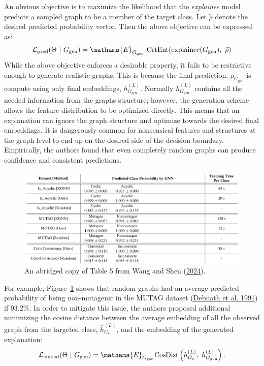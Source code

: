 \documentclass[
  11pt,
  letterpaper,
]{article}
\begin{document}
\quad An obvious objective is to maximize the likelihood that the
\emph{explainee} model predicts a sampled graph to be a member of the
target class. Let \(\tilde{\rho}\) denote the desired predicted
probability vector. Then the above objective can be expressed as:
\begin{equation}
        \mathcal{L}_\text{pred} (\Theta \ | \ G_\text{gen}) = \mathams{E}_{G_\text{gen}} \ \text{CrtEnt} (\text{explainee}(G_\text{gen}), \ \tilde{\rho})
    \end{equation} While the above objective enforces a desirable
property, it fails to be restrictive enough to generate realistic
graphs. This is because the final prediction, \(\rho_{G_{\text{gen}}}\)
is compute using only final embeddings, \(h^{(L)}_{G_{\text{gen}}}\).
Normally \(h^{(L)}_{G_{\text{gen}}}\) contains all the needed
information from the graphs structure; however, the generation scheme
allows the feature distribution to be optimized directly. This means
that an explanation can ignore the graph structure and optimize towards
the desired final embeddings. It is dangerously common for nonsensical
features and structures at the graph level to end up on the desired side
of the decision boundary. Empirically, the authors found that even
completely random graphs can produce confidence and consistent
predictions.

\begin{figure}

{\centering \includegraphics{figures/random_baseline.png}

}

\caption{\label{fig-random-baseline}An abridged copy of Table 5 from
Wang and Shen (\protect\hyperlink{ref-Wang_Shen_2024}{2024}).}

\end{figure}

For example, Figure~\ref{fig-random-baseline} shows that random graphs
had an average predicted probability of being non-mutagenic in the MUTAG
dataset (\protect\hyperlink{ref-Debnath_1991}{Debnath et al. 1991}) if
93.2\%. In order to mitigate this issue, the authors proposed additional
minimizing the cosine distance between the average embedding of all the
observed graph from the targeted class, \(\bar h^{(L)}_{G_c}\), and the
embedding of the generated explanation: \begin{equation}
       \mathcal{L}_{\text{embed}}(\Theta \ | \ G_\text{gen}) = 
            \mathams{E}_{G_\text{gen}}
            \text{CosDist}\left( \bar h^{(L)}_{G_c}, \ h^{(L)}_{G_\text{gen}} \right). 
    \end{equation}
\end{document}
